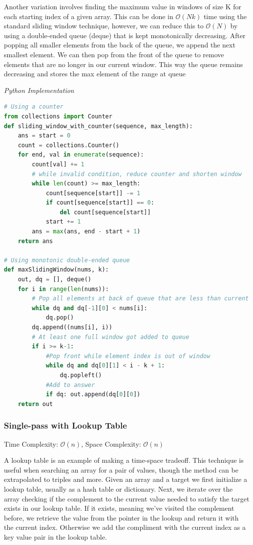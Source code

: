 \documentclass{article}
\newcommand{\bigO}{\mathcal{O}}
\begin{document}
    Another variation involves finding the maximum value in windows of size K for each starting index of a given array. This can be done in $\bigO(Nk)$ time using the standard sliding window technique, however, we can reduce this to $\bigO(N)$ by using a double-ended queue (deque) that is kept monotonically decreasing. After popping all smaller elements from the back of the queue, we append the next smallest element. We can then pop from the front of the queue to remove elements that are no longer in our current window. This way the queue remains decreasing and stores the max element of the range at queue

\vspace{8pt} \emph{Python Implementation}
\begin{lstlisting}[language=Python]
# Using a counter
from collections import Counter
def sliding_window_with_counter(sequence, max_length):
    ans = start = 0
    count = collections.Counter()
    for end, val in enumerate(sequence):
        count[val] += 1
        # while invalid condition, reduce counter and shorten window 
        while len(count) >= max_length:
            count[sequence[start]] -= 1
            if count[sequence[start]] == 0:
                del count[sequence[start]]
            start += 1
        ans = max(ans, end - start + 1)
    return ans
    
# Using monotonic double-ended queue
def maxSlidingWindow(nums, k):
    out, dq = [], deque()
    for i in range(len(nums)):
        # Pop all elements at back of queue that are less than current element
        while dq and dq[-1][0] < nums[i]:
            dq.pop()
        dq.append((nums[i], i))
        # At least one full window got added to queue
        if i >= k-1:
            #Pop front while element index is out of window
            while dq and dq[0][1] < i - k + 1:
                dq.popleft()
            #Add to answer
            if dq: out.append(dq[0][0])
    return out
\end{lstlisting}

    \subsubsection{Single-pass with Lookup Table}
    Time Complexity: $\bigO(n)$, Space Complexity: $\bigO(n)$
    
    A lookup table is an example of making a time-space tradeoff. This technique is useful when searching an array for a pair of values, though the method can be extrapolated to triples and more. Given an array and a target we first initialize a lookup table, usually as a hash table or dictionary. Next, we iterate over the array checking if the complement to the current value needed to satisfy the target exists in our lookup table. If it exists, meaning we've visited the complement before, we retrieve the value from the pointer in the lookup and return it with the current index. Otherwise we add the compliment with the current index as a key value pair in the lookup table.
\end{document}
